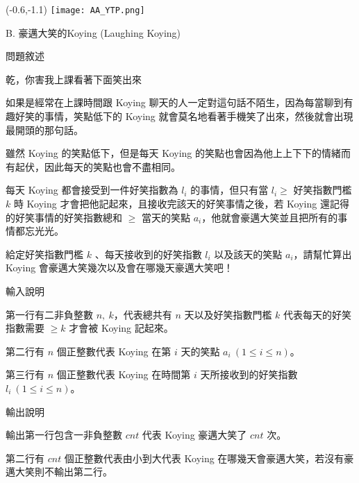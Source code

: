 \documentclass[12pt]{article}
\newcommand{\ProblemTitleFont}{\ProblemTitleMainFont\ProblemTitleCJKFont}
\newcommand{\ProblemTitle}[2]{\noindent\Large{\ProblemTitleFont #1 (#2)}\normalsize\par}
\newcommand{\ProblemSection}[1]{\vspace{0.6cm}\par\noindent\large{\ProblemTitleFont #1}\normalsize\par}
\newcommand{\ProblemStatement}{\ProblemSection{問題敘述}}
\newcommand{\ProblemInput}{\ProblemSection{輸入說明}}
\newcommand{\ProblemOutput}{\ProblemSection{輸出說明}}
\begin{document}

\begin{textblock}{0.1}(-0.6,-1.1)
	\texttt{[image: AA\_YTP.png]}
\end{textblock}




\renewcommand{\headrulewidth}{0pt}
\renewcommand{\baselinestretch}{1.3}
\setlength\parindent{24pt}
\setlength\parskip{12pt}
\cfoot{\thepage}

\ProblemTitle{B. 豪邁大笑的Koying}{Laughing Koying}

\ProblemStatement

乾，你害我上課看著下面笑出來

如果是經常在上課時間跟 Koying 聊天的人一定對這句話不陌生，因為每當聊到有趣好笑的事情，笑點低下的 Koying 就會莫名地看著手機笑了出來，然後就會出現最開頭的那句話。

雖然 Koying 的笑點低下，但是每天 Koying 的笑點也會因為他上上下下的情緒而有起伏，因此每天的笑點也會不盡相同。

每天 Koying 都會接受到一件好笑指數為 $l_i$ 的事情，但只有當 $l_i \ge$ 好笑指數門檻 $k$ 時 Koying 才會把他記起來，且接收完該天的好笑事情之後，若 Koying 還記得的好笑事情的好笑指數總和 $\ge$ 當天的笑點 $a_i$，他就會豪邁大笑並且把所有的事情都忘光光。

給定好笑指數門檻 $k$ 、每天接收到的好笑指數 $l_i$ 以及該天的笑點 $a_i$，請幫忙算出 Koying 會豪邁大笑幾次以及會在哪幾天豪邁大笑吧！

\ProblemInput

第一行有二非負整數 $n,\ k$，代表總共有 $n$ 天以及好笑指數門檻 $k$ 代表每天的好笑指數需要 $\ge k$ 才會被 Koying 記起來。

第二行有 $n$ 個正整數代表 Koying 在第 $i$ 天的笑點 $a_i\ (1 \le i \le n)$。

第三行有 $n$ 個正整數代表 Koying 在時間第 $i$ 天所接收到的好笑指數 $l_i\ (1 \le i \le n)$。


\ProblemOutput

輸出第一行包含一非負整數 $cnt$ 代表 Koying 豪邁大笑了 $cnt$ 次。

第二行有 $cnt$ 個正整數代表由小到大代表 Koying 在哪幾天會豪邁大笑，若沒有豪邁大笑則不輸出第二行。
\end{document}
